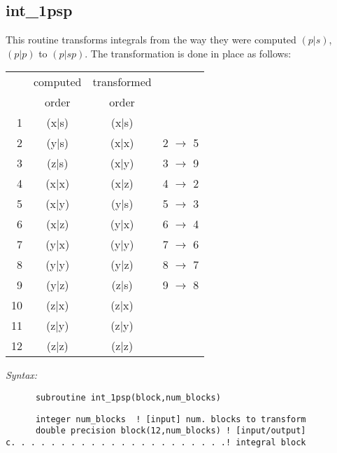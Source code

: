 \subsection{int\_1psp} 
This routine transforms integrals from the way they 
were computed $(p|s)$, $(p|p)$ to $(p|sp)$. 
The transformation is done in place as follows: 
\begin{tabular}{rccc} 
 & computed & transformed & \\ 
 &  order   &   order     & \\ 
~1 & (x|s)  &  (x|s)  & \\ 
~2 & (y|s)  &  (x|x)  & 2 $\rightarrow$ 5\\ 
~3 & (z|s)  &  (x|y)  & 3 $\rightarrow$ 9\\ 
~4 & (x|x)  &  (x|z)  & 4 $\rightarrow$ 2\\ 
~5 & (x|y)  &  (y|s)  & 5 $\rightarrow$ 3\\ 
~6 & (x|z)  &  (y|x)  & 6 $\rightarrow$ 4\\ 
~7 & (y|x)  &  (y|y)  & 7 $\rightarrow$ 6\\ 
~8 & (y|y)  &  (y|z)  & 8 $\rightarrow$ 7\\ 
~9 & (y|z)  &  (z|s)  & 9 $\rightarrow$ 8\\ 
10 & (z|x)  &  (z|x)  &  \\ 
11 & (z|y)  &  (z|y)  &  \\ 
12 & (z|z)  &  (z|z)  &  \\ 
\end{tabular} 
  
{\it Syntax:} 
\begin{verbatim} 
      subroutine int_1psp(block,num_blocks) 
\end{verbatim} 
\begin{verbatim} 
      integer num_blocks  ! [input] num. blocks to transform 
      double precision block(12,num_blocks) ! [input/output]  
c. . . . . . . . . . . . . . . . . . . . . .! integral block 
\end{verbatim} 
